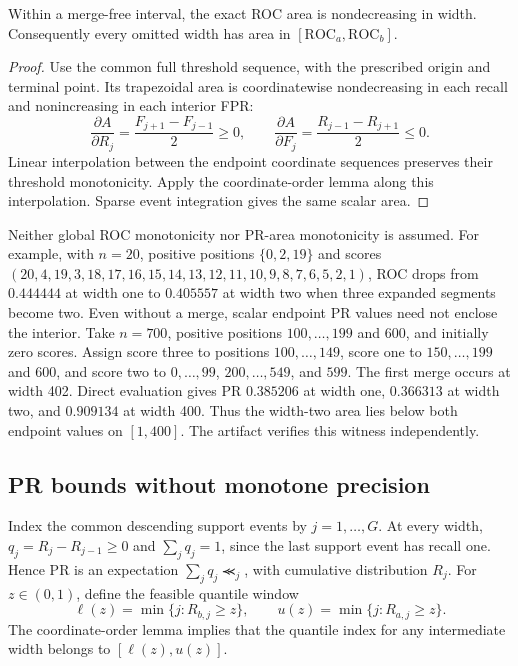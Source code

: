\begin{theorem}
Within a merge-free interval, the exact ROC area is nondecreasing in width.
Consequently every omitted width has area in
$[\mathrm{ROC}_a,\mathrm{ROC}_b]$.
\end{theorem}
\begin{proof}
Use the common full threshold sequence, with the prescribed origin and
terminal point. Its trapezoidal area is coordinatewise nondecreasing in each
recall and nonincreasing in each interior FPR:
\[
 \frac{\partial A}{\partial R_j}=\frac{F_{j+1}-F_{j-1}}2\ge0,\qquad
 \frac{\partial A}{\partial F_j}=\frac{R_{j-1}-R_{j+1}}2\le0 .
\]
Linear interpolation between the endpoint coordinate sequences preserves
their threshold monotonicity. Apply the coordinate-order lemma along this
interpolation. Sparse event integration gives the same scalar area.
\end{proof}

Neither global ROC monotonicity nor PR-area monotonicity is assumed.
For example, with $n=20$, positive positions $\{0,2,19\}$ and scores
$(20,4,19,3,18,17,16,15,14,13,12,11,10,9,8,7,6,5,2,1)$,
ROC drops from $0.444444$ at width one to $0.405557$ at width two when
three expanded segments become two.
Even without a merge, scalar endpoint PR values need not enclose the
interior. Take $n=700$, positive positions $100,\ldots,199$ and $600$,
and initially zero scores. Assign score three to positions $100,\ldots,149$,
score one to $150,\ldots,199$ and $600$, and score two to
$0,\ldots,99$, $200,\ldots,549$, and $599$. The first merge occurs at
width 402. Direct evaluation gives PR $0.385206$ at width one,
$0.366313$ at width two, and $0.909134$ at width 400.
Thus the width-two area lies below both endpoint values on $[1,400]$.
The artifact verifies this witness independently.

\subsection{PR bounds without monotone precision}
Index the common descending support events by $j=1,\ldots,G$.
At every width, $q_j=R_j-R_{j-1}\ge0$ and $\sum_jq_j=1$, since the
last support event has recall one. Hence PR is an expectation
$\sum_j q_j\Prec_j$, with cumulative distribution $R_j$.
For $z\in(0,1)$, define the feasible quantile window
\[
 \ell(z)=\min\{j:R_{b,j}\ge z\},\qquad
 u(z)=\min\{j:R_{a,j}\ge z\}.
\]
The coordinate-order lemma implies that the quantile index for any
intermediate width belongs to $[\ell(z),u(z)]$.

